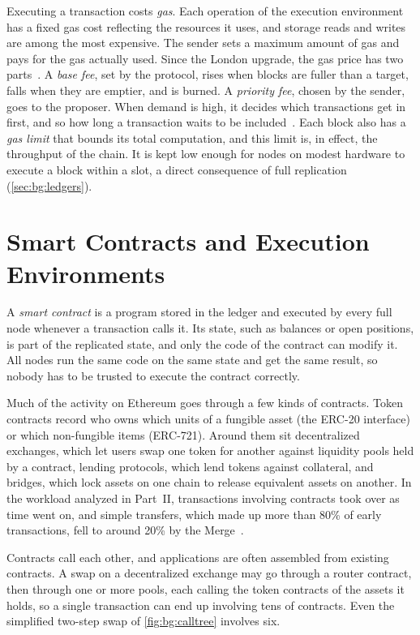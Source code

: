 Executing a transaction costs \emph{gas}.
Each operation of the execution environment has a fixed gas cost reflecting the resources it uses, and storage reads and writes are among the most expensive.
The sender sets a maximum amount of gas and pays for the gas actually used.
Since the London upgrade, the gas price has two parts~\cite{eip1559,roughgarden2021tfm}.
A \emph{base fee}, set by the protocol, rises when blocks are fuller than a target, falls when they are emptier, and is burned.
A \emph{priority fee}, chosen by the sender, goes to the proposer.
When demand is high, it decides which transactions get in first, and so how long a transaction waits to be included~\cite{pacheco2023my}.
Each block also has a \emph{gas limit} that bounds its total computation, and this limit is, in effect, the throughput of the chain.
It is kept low enough for nodes on modest hardware to execute a block within a slot, a direct consequence of full replication (\autoref{sec:bg:ledgers}).

\section{Smart Contracts and Execution Environments}\label{sec:bg:execution}

A \emph{smart contract} is a program stored in the ledger and executed by every full node whenever a transaction calls it.
Its state, such as balances or open positions, is part of the replicated state, and only the code of the contract can modify it.
All nodes run the same code on the same state and get the same result, so nobody has to be trusted to execute the contract correctly.

Much of the activity on Ethereum goes through a few kinds of contracts.
Token contracts record who owns which units of a fungible asset (the ERC-20 interface) or which non-fungible items (ERC-721).
Around them sit decentralized exchanges, which let users swap one token for another against liquidity pools held by a contract, lending protocols, which lend tokens against collateral, and bridges, which lock assets on one chain to release equivalent assets on another.
In the workload analyzed in Part~II, transactions involving contracts took over as time went on, and simple transfers, which made up more than 80\% of early transactions, fell to around 20\% by the Merge~\cite{pigaglio2023exploring}.

Contracts call each other, and applications are often assembled from existing contracts.
A swap on a decentralized exchange may go through a router contract, then through one or more pools, each calling the token contracts of the assets it holds, so a single transaction can end up involving tens of contracts.
Even the simplified two-step swap of \autoref{fig:bg:calltree} involves six.

